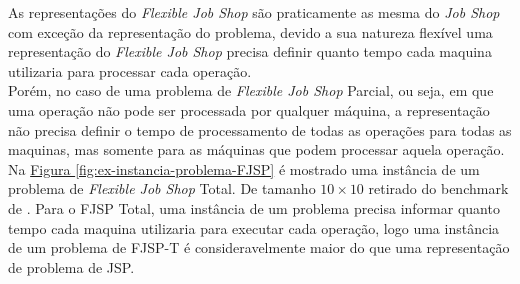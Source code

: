             As representações do \textit{Flexible Job Shop} são praticamente as mesma do \textit{Job Shop} com exceção da representação do problema, devido a sua natureza flexível uma representação do \textit{Flexible Job Shop} precisa definir quanto tempo cada maquina utilizaria para processar cada operação.\\
            \indent Porém, no caso de uma problema de \textit{Flexible Job Shop} Parcial, ou seja, em que uma operação não pode ser processada por qualquer máquina, a representação não precisa definir o tempo de processamento de todas as operações para todas as maquinas, mas somente para as máquinas que podem processar aquela operação.\\
\indent Na 
\hyperref[fig:ex-instancia-problema-FJSP]{Figura \ref{fig:ex-instancia-problema-FJSP}}
é mostrado uma instância de um problema de \textit{Flexible Job Shop} Total. De tamanho $10\times10$ retirado do benchmark de \cite{Kacem2002}.
%
Para o FJSP Total, uma instância de um problema precisa informar quanto tempo cada maquina utilizaria para executar cada operação, logo uma instância de um problema de FJSP-T é consideravelmente maior do que uma representação de problema de JSP.
